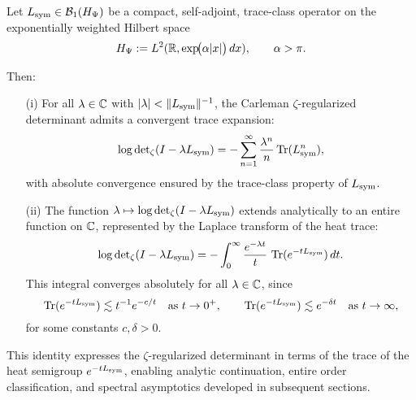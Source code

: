 \begin{lemma}
\label{lem:det_via_heat_trace}
Let \( L_{\mathrm{sym}} \in \mathcal{B}_1(H_{\Psi}) \) be a compact, self-adjoint, trace-class operator on the exponentially weighted Hilbert space
\[
H_{\Psi} := L^2(\mathbb{R}, \exp\!\bigl(\alpha |x|\bigr) \, dx), \qquad \alpha > \pi.
\]

Then:
\begin{enumerate}
  \item[\textnormal{(i)}] For all \( \lambda \in \mathbb{C} \) with \( |\lambda| < \|L_{\mathrm{sym}}\|^{-1} \), the Carleman \(\zeta\)-regularized determinant admits a convergent trace expansion:
  \[
  \log \det\nolimits_{\zeta}(I - \lambda L_{\mathrm{sym}})
  = - \sum_{n=1}^\infty \frac{\lambda^n}{n} \operatorname{Tr}(L_{\mathrm{sym}}^n),
  \]
  with absolute convergence ensured by the trace-class property of \( L_{\mathrm{sym}} \).

  \item[\textnormal{(ii)}] The function \( \lambda \mapsto \log \det\nolimits_\zeta(I - \lambda L_{\mathrm{sym}}) \) extends analytically to an entire function on \( \mathbb{C} \), represented by the Laplace transform of the heat trace:
  \[
  \log \det\nolimits_\zeta(I - \lambda L_{\mathrm{sym}})
  = - \int_0^\infty \frac{e^{-\lambda t}}{t} \, \operatorname{Tr}(e^{-t L_{\mathrm{sym}}}) \, dt.
  \]
  This integral converges absolutely for all \( \lambda \in \mathbb{C} \), since
  \[
  \operatorname{Tr}(e^{-t L_{\mathrm{sym}}}) \lesssim t^{-1} e^{-c/t}
  \quad \text{as } t \to 0^+, \qquad
  \operatorname{Tr}(e^{-t L_{\mathrm{sym}}}) \lesssim e^{-\delta t} \quad \text{as } t \to \infty,
  \]
  for some constants \( c, \delta > 0 \).
\end{enumerate}

\medskip
\noindent
This identity expresses the \(\zeta\)-regularized determinant in terms of the trace of the heat semigroup \( e^{-t L_{\mathrm{sym}}} \), enabling analytic continuation, entire order classification, and spectral asymptotics developed in subsequent sections.
\end{lemma}
